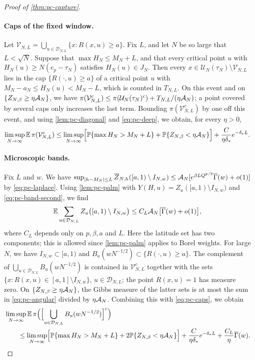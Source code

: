 \begin{proof}[Proof of \cref{thm:pc-capture}]
\paragraph{Caps of the fixed window.}
Let $\mathcal V_{N,L}=\bigcup_{u\in\mathcal D_{N,L}}\{x:R(x,u)\ge a\}$. Fix $L$, and let $N$ be so large that $L<\sqrt N$. Suppose that $\max H_N\le M_N+L$, and that every critical point $u$ with $H_N(u)\ge N(e_p-\tau_N)$ satisfies $H_N(u)\in J_N$. Then every $x\in\mathcal U_N(\tau_N)\setminus\mathcal V_{N,L}$ lies in the cap $\{R(\cdot,u)\ge a\}$ of a critical point $u$ with $M_N-a_N\le H_N(u)<M_N-L$, which is counted in $T_{N,L}$. On this event and on $\{Z_{N,\beta}\ge\eta\mathcal A_N\}$, we have $\pi(\mathcal V_{N,L}^c)\le\pi(\mathcal U_N(\tau_N)^c)+T_{N,L}/(\eta\mathcal A_N)$; a point covered by several caps only increases the last term. Bounding $\pi(\mathcal V_{N,L}^c)$ by one off this event, and using \cref{lem:pc-diagonal} and \eqref{eq:pc-deep}, we obtain, for every $\eta>0$,
\begin{equation}\label{eq:pc-caps}
\limsup_{N\to\infty}\mathbb E\,\pi(\mathcal V_{N,L}^c)\le\limsup_{N\to\infty}\Bigl[\mathbb P\{\max H_N>M_N+L\}+\mathbb P\{Z_{N,\beta}<\eta\mathcal A_N\}\Bigr]+\frac C{\eta\delta_*}e^{-\delta_*L}.
\end{equation}

\paragraph{Microscopic bands.}
Fix $L$ and $w$. We have $\sup_{|h-M_N|\le L}\overline Z_{N,h}([a,1)\setminus I_{N,w})\le\mathcal A_N[e^{\beta LQ^{p/2}}\overline\Gamma(w)+o(1)]$ by \eqref{eq:pc-laplace}. Using \cref{lem:pc-palm} with $Y(H,u)=Z_u([a,1)\setminus I_{N,w})$ and \eqref{eq:pc-band-second}, we find
\begin{equation}\label{eq:pc-angular}
\mathbb E\sum_{u\in\mathcal D_{N,L}}Z_u\bigl([a,1)\setminus I_{N,w}\bigr)\le C_L\mathcal A_N\bigl[\overline\Gamma(w)+o(1)\bigr],
\end{equation}
where $C_L$ depends only on $p,\beta,a$ and $L$. Here the latitude set has two components; this is allowed since \cref{lem:pc-palm} applies to Borel weights. For large $N$, we have $I_{N,w}\subset[a,1)$ and $B_u(wN^{-1/2})\subset\{R(\cdot,u)\ge a\}$. The complement of $\bigcup_{u\in\mathcal D_{N,L}}B_u(wN^{-1/2})$ is contained in $\mathcal V_{N,L}^c$ together with the sets $\{x:R(x,u)\in[a,1]\setminus I_{N,w}\}$, $u\in\mathcal D_{N,L}$; the point $R(x,u)=1$ has measure zero. On $\{Z_{N,\beta}\ge\eta\mathcal A_N\}$, the Gibbs measure of the latter sets is at most the sum in \eqref{eq:pc-angular} divided by $\eta\mathcal A_N$. Combining this with \eqref{eq:pc-caps}, we obtain
\begin{equation}\label{eq:pc-final}
\begin{split}
&\limsup_{N\to\infty}\mathbb E\,\pi\Bigl(\Bigl[\bigcup_{u\in\mathcal D_{N,L}}B_u(wN^{-1/2})\Bigr]^c\Bigr)\\
&\qquad\le\limsup_{N\to\infty}\Bigl[\mathbb P\{\max H_N>M_N+L\}+2\mathbb P\{Z_{N,\beta}<\eta\mathcal A_N\}\Bigr]+\frac C{\eta\delta_*}e^{-\delta_*L}+\frac{C_L}\eta\overline\Gamma(w).
\end{split}
\end{equation}


\end{proof}

